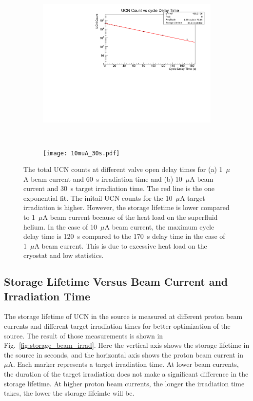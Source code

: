 \begin{figure}[h!]
  \centering
  \begin{subfigure}{.8\textwidth}
    \centering
    \includegraphics[width=1.0\textwidth]{17002_StorageLifetime.pdf}
    \caption{}
    \label{fig:storage_example1}
  \end{subfigure}%
  \\
  \begin{subfigure}{.8\textwidth}
    \centering
    \texttt{[image: 10muA\_30s.pdf]}
    \caption{}
    \label{fig:storage_example10}
  \end{subfigure}
  \caption{The total UCN counts at different valve open delay times for
    (a) 1~$\mu$A beam current and 60~s irradiation time and (b)
    10~$\mu$A beam current and 30~s target irradiation time. The red
    line is the one exponential fit. The initail UCN counts for the
    10~$\mu$A target irradiation is higher. However, the storage
    lifetime is lower compared to 1~$\mu$A beam current because of the
    heat load on the superfluid helium. In the case of 10~$\mu$A beam
    current, the maximum cycle delay time is 120~s compared to the 170~s
    delay time in the case of 1~$\mu$A beam current. This is due to
    excessive heat load on the cryostat and low statistics.}
  \label{fig:storage_example}
\end{figure}


\subsection{Storage Lifetime Versus Beam Current and Irradiation Time}
The storage lifetime of UCN in the source is measured at different
proton beam currents and different target irradiation times for better
optimization of the source. The result of those measurements is shown
in Fig.~\ref{fig:storage_beam_irrad}. Here the vertical axis shows the
storage lifetime in the source in seconds, and the horizontal axis
shows the proton beam current in $\mu$A. Each marker represents a
target irradiation time. At lower beam currents, the duration of the
target irradiation does not make a significant difference in the
storage lifetime. At higher proton beam currents, the longer the
irradiation time takes, the lower the storage lifeimte will be.


